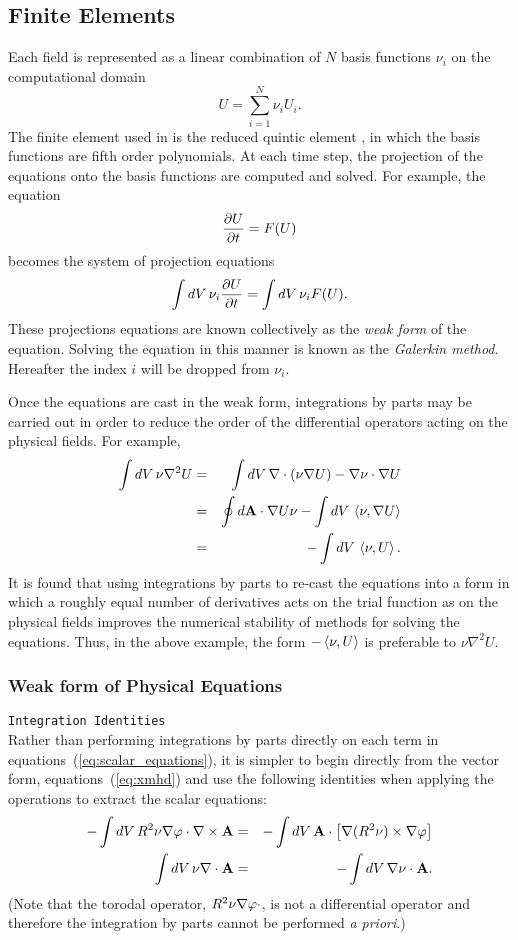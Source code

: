 \subsection{Finite Elements}

Each field is represented as a linear combination of $N$ basis
functions $\nu_i$ on the computational domain
\[ U = \sum_{i=1}^N \nu_i U_i. \]
The finite element used in \codename is the reduced quintic element
\cite{Jardin04}, in which the basis functions are fifth order
polynomials.  At each time step, the projection of the equations onto
the basis functions are computed and solved.  For example, the
equation
\[ \frac{\partial U}{\partial t} = F(U) \]
becomes the system of projection equations
\[ \int dV\, \nu_i \frac{\partial U}{\partial t} = \int dV\, \nu_i F(U). \]
These projections equations are known collectively as the \emph{weak
form} of the equation.  Solving the equation in this manner is known
as the \emph{Galerkin method}.  Hereafter the index $i$ will be
dropped from $\nu_i$.

Once the equations are cast in the weak form, integrations by parts
may be carried out in order to reduce the order of the differential
operators acting on the physical fields.  For example, 
\begin{eqnarray*}
  \int dV\, \nu \nabla^2 U 
  & = & \int dV\, \nabla \cdot (\nu \nabla U) - \nabla \nu \cdot \nabla U\\
  & = & \oint d\mathbf{A} \cdot \nabla U \nu - \int dV\, \left\langle \nu,\nabla U\right\rangle\\
  & = & - \int dV\, \left\langle \nu,U\right\rangle.
\end{eqnarray*}
It is found that using integrations by parts to re-cast the equations
into a form in which a roughly equal number of derivatives acts on the
trial function as on the physical fields improves the numerical
stability of methods for solving the equations.  Thus, in the above
example, the form $-\left\langle \nu,U\right\rangle$ is preferable to $\nu \nabla^2
U$.

\subsubsection{Weak form of Physical Equations}

\texttt{Integration Identities}
\\
Rather than performing integrations by parts directly on each term in
equations~(\ref{eq:scalar_equations}), it is simpler to begin directly
from the vector form, equations~(\ref{eq:xmhd}) and use the following
identities when applying the operations to extract the scalar
equations:
\begin{eqnarray*}
  -\int dV\, R^2 \nu \nabla \varphi \cdot \nabla \times \mathbf{A} & = & 
  -\int dV\, \mathbf{A} \cdot \left[\nabla (R^2 \nu) \times \nabla \varphi
    \right]
  \\
  \int dV\, \nu \nabla \cdot \mathbf{A} & = & 
  -\int dV\, \nabla \nu \cdot \mathbf{A}.
\end{eqnarray*}
(Note that the torodal operator, $R^2 \nu \nabla \varphi \cdot$, is not a
differential operator and therefore the integration by parts cannot be
performed \emph{a priori}.)  

